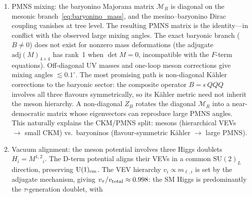 \documentclass[12pt,a4paper]{article}
\newcommand{\SU}{\mathrm{SU}}
\newcommand{\UU}{\mathrm{U}}
\newcommand{\adj}{\mathrm{adj}}
\begin{document}
\begin{enumerate}
    quarks (inverse Koide). The restriction $\gamma \in \{0, 1\}$
    is not arbitrary: the superpotential is holomorphic in $M$ and
    $\adj(M)$, so the most general Yukawa operator is
    $W \supset q\,\bar{q}\,M^a\,\adj(M)^b/\Lambda^n$ with
    $a, b \in \mathbb{Z}_{\ge 0}$. On the constraint surface
    $\adj(M) = \Lambda^6 M^{-1}$, the generation-dependent mass
    scaling is $m_q \propto m_{\rm UV}^{a-b}$: the exponent
    $p = a - b$ is automatically an integer. EFT power counting
    selects the two leading operators: $(a,b) = (1,0)$ (renormalisable,
    $p{=}{+}1$) and $(a,b) = (0,1)$ ($p{=}{-}1$), related by the
    $\mathbf{15} \leftrightarrow \overline{\mathbf{15}}$ exchange
    under $\SU(5)_{\rm flav}$.  The remaining question is narrower:
    what determines the \emph{assignment} (why do down quarks couple
    to $M$ rather than $\adj(M)$?)---this is fixed by hypercharge
    ($Y(M^{1,2}) = -\tfrac{1}{2}$, $Y(\adj(M)^{1,2}) = +\tfrac{1}{2}$).
  \item PMNS mixing: the baryonino Majorana matrix $\mathcal{M}_R$ is
    diagonal on the mesonic branch~\eqref{eq:baryonino_mass}, and the
    mesino--baryonino Dirac coupling vanishes at tree level.  The
    resulting PMNS matrix is the identity---in conflict with the
    observed large mixing angles.  The exact baryonic branch
    ($B \neq 0$) does not exist for nonzero mass deformations
    (the adjugate $\adj(M)_{4\times 4}$ has rank~1 when
    $\det M = 0$, incompatible with the $F$-term equations).
    Off-diagonal UV masses and one-loop meson corrections give
    mixing angles $\lesssim 0.1^{\circ}$.
    The most promising path is non-diagonal K\"ahler corrections
    to the baryonic sector: the composite operator $B = \epsilon\,QQQ$
    involves all three flavours symmetrically, so its K\"ahler metric
    need not inherit the meson hierarchy.  A non-diagonal $Z_B$
    rotates the diagonal $\mathcal{M}_R$ into a near-democratic
    matrix whose eigenvectors can reproduce large PMNS angles.
    This naturally explains the CKM/PMNS split: mesons (hierarchical
    VEVs $\to$ small CKM) vs.\ baryoninos (flavour-symmetric
    K\"ahler $\to$ large PMNS).
  \item Vacuum alignment: the meson potential involves three Higgs doublets
    $H_i = M^{1,2}{}_i$. The D-term potential aligns their VEVs in a
    common $\SU(2)_L$ direction, preserving $\UU(1)_{\rm em}$.
    The VEV hierarchy $v_i \propto m_{\ell,i}$ is set by the adjugate
    mechanism, giving $v_\tau/v_{\rm total} \approx 0.998$: the SM
    Higgs is predominantly the $\tau$-generation doublet, with

\end{enumerate}
\end{document}
